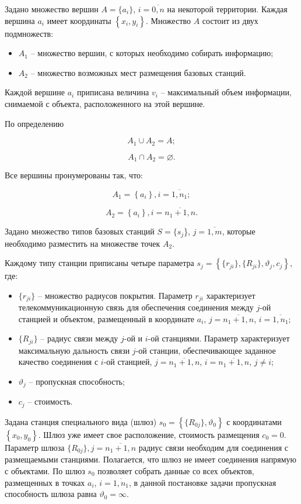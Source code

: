 Задано множество вершин $A = \{a_i\}$, $i=\overline{0,n}$ на некоторой территории. Каждая вершина $a_i$ имеет координаты $\left\{ x_i, y_i \right\}$.
Множество $A$ состоит из двух подмножеств: 
\begin{itemize}
    \item $A_1$ -- множество вершин, с которых необходимо собирать информацию;
    \item $A_2$ -- множество возможных мест размещения базовых станций. 
\end{itemize}
Каждой вершине $a_i$ приписана   величина $v_i$ -- максимальный объем информации, снимаемой с объекта, расположенного на этой вершине.

По определению

$$
A_1 \cup A_2 = A;
$$

$$
A_1 \cap A_2 = \varnothing.
$$

Все вершины пронумерованы так, что:

$$
A_1 = \left\{a_i \right\}, i= \overline{1,n_1};
$$

$$
A_2 = \left\{ a_i  \right\}, i= \overline{n_1+1,n}.
$$


Задано множество типов базовых станций $S = \{s_j$\}, $j=\overline{1,m}$, которые необходимо разместить на множестве точек $A_2$.

Каждому типу станции приписаны четыре параметра $s_j = \left\{\{r_{ji}\}, \{R_{ji}\}, \vartheta_j, c_j \right\}$, где: 
\begin{itemize}
    \item $\{r_{ji}\}$ -- множество радиусов покрытия. Параметр $r_{ji}$ характеризует телекоммуникационную связь для обеспечения соединения между $j$-ой станцией и объектом, размещенный в координате $a_i$, $j= \overline{n_1+1,n}$, $i= \overline{1,n_1}$;
    \item $\{R_{ji}\}$ -- радиус связи между $j$-ой и $i$-ой станциями. Параметр характеризует максимальную дальность связи $j$-ой станции, обеспечивающее заданное качество соединения с $i$-ой станцией, $j= \overline{n_1+1,n}$, $i= \overline{n_1+1,n}$, $j \neq i$;
    \item $\vartheta_j$ -- пропускная способность;
    \item $c_j$ -- стоимость.
\end{itemize}


Задана станция специального вида (шлюз) $s_0 = \left\{ \{R_{0j}\}, \vartheta_0 \right\}$ с координатами $\left\{x_0, y_0 \right\}$. Шлюз уже имеет свое расположение, стоимость размещения $c_0 = 0$. Параметр шлюза $\{R_{0j}\}, j = \overline{n_1+1,n}$ радиус связи необходим для соединения с размещаемыми станциями. Полагается, что шлюз не имеет соединения напрямую с объектами. По шлюз $s_0$ позволяет собрать данные со всех объектов, размещенных в точках $a_i$, $i= \overline{1,n_1}$, в данной постановке задачи пропускная способность шлюза равна $\vartheta_0 = \infty$.



